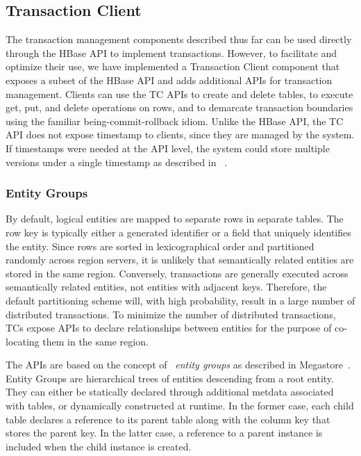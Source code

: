 \documentclass[10pt,final,journal]{IEEEtran}
\begin{document}
\subsection{Transaction Client}
The transaction management components described thus far can be used directly through the HBase API to implement transactions. However, to facilitate and optimize their use, we have implemented a Transaction Client component that exposes a subset of the HBase API and adds additional APIs for transaction management. Clients can use the TC APIs to create and delete tables, to execute get, put, and delete operations on rows, and to demarcate transaction boundaries using the familiar being-commit-rollback idiom. Unlike the HBase API, the TC API does not expose timestamp to clients, since they are managed by the system. If timestamps were needed at the API level, the system could store multiple versions under a single timestamp as described in ~\cite{Peng:2010:LIP:1924943.1924961}.

\subsubsection{Entity Groups}
By default, logical entities are mapped to separate rows in separate tables. The row key is typically either a generated identifier or a field that uniquely identifies the entity. Since rows are sorted in lexicographical order and partitioned randomly across region servers, it is unlikely that semantically related entities are stored in the same region. Conversely, transactions are generally executed across semantically related entities, not entities with adjacent keys. Therefore, the default partitioning scheme will, with high probability, result in a large number of distributed transactions. To minimize the number of distributed transactions, TCs expose APIs to declare relationships between entities for the purpose of co-locating them in the same region.

The APIs are based on the concept of ~\emph{entity groups} as described in Megastore~\cite{Baker:2011:8530095}. Entity Groups are hierarchical trees of entities descending from a root entity. They can either be statically declared through additional metdata associated with tables, or dynamically constructed at runtime. In the former case, each child table declares a reference to its parent table along with the column key that stores the parent key. In the latter case, a reference to a parent instance is included when the child instance is created.
\end{document}
